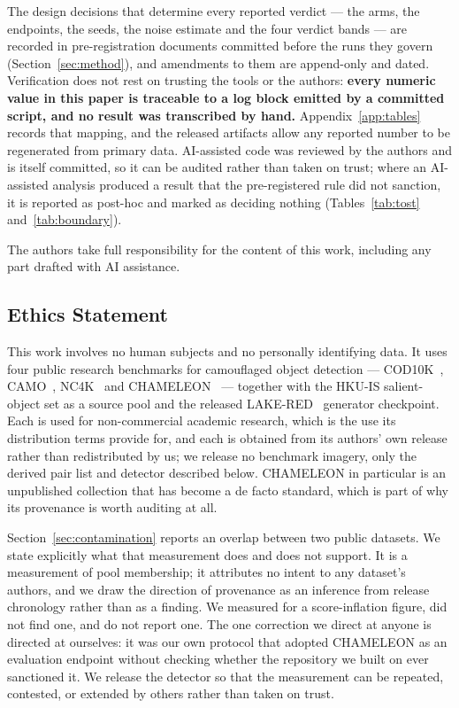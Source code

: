\documentclass{article} %
\begin{document}
The design decisions that determine every reported verdict --- the arms, the endpoints, the seeds,
the noise estimate and the four verdict bands --- are recorded in pre-registration documents
committed before the runs they govern (Section~\ref{sec:method}), and amendments to them are
append-only and dated. Verification does not rest on trusting the tools or the authors:
\textbf{every numeric value in this paper is traceable to a log block emitted by a committed script,
and no result was transcribed by hand.} Appendix~\ref{app:tables} records that mapping, and the
released artifacts allow any reported number to be regenerated from primary data. AI-assisted code
was reviewed by the authors and is itself committed, so it can be audited rather than taken on
trust; where an AI-assisted analysis produced a result that the pre-registered rule did not
sanction, it is reported as post-hoc and marked as deciding nothing
(Tables~\ref{tab:tost} and~\ref{tab:boundary}).

The authors take full responsibility for the content of this work, including any part drafted with
AI assistance.

\subsection*{Ethics Statement}

This work involves no human subjects and no personally identifying data. It uses four public
research benchmarks for camouflaged object detection --- COD10K~\cite{fan2022concealed},
CAMO~\cite{le2019anabranch}, NC4K~\cite{lv2021simultaneously} and
CHAMELEON~\cite{skurowski2018animal} --- together with the HKU-IS salient-object set as a source
pool and the released LAKE-RED~\cite{zhao2024lakered} generator checkpoint. Each is used for
non-commercial academic research, which is the use its distribution terms provide for, and each is
obtained from its authors' own release rather than redistributed by us; we release no benchmark
imagery, only the derived pair list and detector described below.
CHAMELEON in particular is an unpublished collection that has become a de facto standard, which is
part of why its provenance is worth auditing at all.

Section~\ref{sec:contamination} reports an overlap between two public datasets. We state explicitly
what that measurement does and does not support. It is a measurement of pool membership; it attributes
no intent to any dataset's authors, and we draw the direction of provenance as an inference from
release chronology rather than as a finding. We measured for a score-inflation figure, did not find
one, and do not report one. The one correction we direct at anyone is directed at ourselves: it was
our own protocol that adopted CHAMELEON as an evaluation endpoint without checking whether the
repository we built on ever sanctioned it. We release the detector so that the measurement can be
repeated, contested, or extended by others rather than taken on trust.
\end{document}
